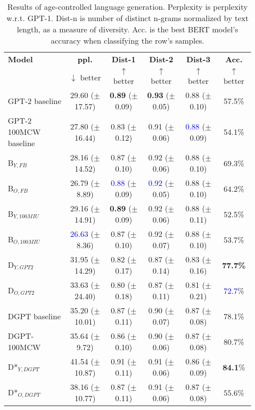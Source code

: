 \begin{table*}[h!]
    \centering
    \begin{tabular}{l c c c c c}
    \toprule
    \textbf{Model} & \textbf{ppl.} & \textbf{Dist-1} & \textbf{Dist-2} & \textbf{Dist-3} & \textbf{Acc.}\\
     & $\downarrow$ better & $\uparrow$ better & $\uparrow$ better & $\uparrow$ better & $\uparrow$ better\\
    \midrule
    \midrule
    GPT-2 baseline & 29.60 ($\pm$17.57) & \textbf{0.89} ($\pm$0.09) & \textbf{0.93} ($\pm$0.05) & 0.88 ($\pm$0.10) & 57.5\%\\
    GPT-2 100MCW baseline & 27.80 ($\pm$16.44) & 0.83 ($\pm$0.12) & 0.91 ($\pm$0.06) & \textcolor{blue}{0.88} ($\pm$0.09) & 54.1\%\\
    \midrule
    B$_{Y, FB}$ & 28.16 ($\pm$14.52) & 0.87 ($\pm$0.10) & 0.92 ($\pm$0.06) & 0.88 ($\pm$0.10) & 69.3\%\\
    B$_{O, FB}$ & 26.79 ($\pm$8.89) & \textcolor{blue}{0.88} ($\pm$0.09) & \textcolor{blue}{0.92} ($\pm$0.05) & 0.88 ($\pm$0.10) & 64.2\%\\
    B$_{Y, 100MIU}$ & 29.16 ($\pm$14.91) & \textbf{0.89} ($\pm$0.09) & 0.92 ($\pm$0.06) & 0.88 ($\pm$0.11) & 52.5\%\\
    B$_{O, 100MIU}$ & \textcolor{blue}{26.63} ($\pm$8.36) & 0.87 ($\pm$0.10) & 0.92 ($\pm$0.07) & 0.88 ($\pm$0.10) & 53.7\%\\
    \midrule
    D$_{Y, GPT2}$ & 31.95 ($\pm$14.29) & 0.82 ($\pm$0.17) & 0.87 ($\pm$0.14) & 0.83 ($\pm$0.16) & \textbf{77.7\%}\\
    D$_{O, GPT2}$ & 33.63 ($\pm$24.40) & 0.80 ($\pm$0.18) & 0.87 ($\pm$0.11) & 0.81 ($\pm$0.21) & \textcolor{blue}{72.7}\%\\
    \midrule
    DGPT baseline & 35.20 ($\pm$10.01) & 0.87 ($\pm$0.11) & 0.90 ($\pm$0.07) & 0.87 ($\pm$0.08) & 78.1\%\\
    DGPT-100MCW & 35.64 ($\pm$9.72) & 0.86 ($\pm$0.10) & 0.90 ($\pm$0.06) & 0.87 ($\pm$0.08) & 80.7\%\\
    D*$_{Y, DGPT}$ & 41.54 ($\pm$10.87) & 0.91 ($\pm$0.11) & 0.91 ($\pm$0.06) & 0.86 ($\pm$0.09) & \textbf{84.1}\%\\
    D*$_{O, DGPT}$ & 38.16 ($\pm$10.77) & 0.87 ($\pm$0.11) & 0.91 ($\pm$0.06) & 0.87 ($\pm$0.08) & 55.6\%\\
    \bottomrule
    \end{tabular}
    \caption{ Results of age-controlled language generation. Perplexity is perplexity w.r.t. GPT-1. Dist-n is number of distinct n-grams normalized by text length, as a measure of diversity. Acc. is the best BERT model's accuracy when classifying the row's samples.}
    \label{tab:ctg_results_ws}
\end{table*}